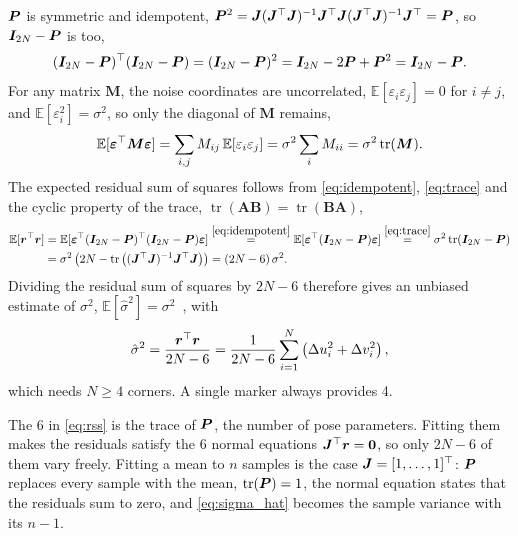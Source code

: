\documentclass{article}
\begin{document}
$\bm{P}$ is symmetric and idempotent, $\bm{P}^2 = \bm{J} (\bm{J}^\top \bm{J})^{-1} \bm{J}^\top \bm{J} (\bm{J}^\top \bm{J})^{-1} \bm{J}^\top = \bm{P}$, so $\bm{I}_{2N} - \bm{P}$ is too,
\begin{equation}
  (\bm{I}_{2N} - \bm{P})^\top (\bm{I}_{2N} - \bm{P}) = (\bm{I}_{2N} - \bm{P})^2 = \bm{I}_{2N} - 2\bm{P} + \bm{P}^2 = \bm{I}_{2N} - \bm{P} . \label{eq:idempotent}
\end{equation}
For any matrix $\bm{M}$, the noise coordinates are uncorrelated, $\mathbb{E}[\varepsilon_i \varepsilon_j] = 0$ for $i \neq j$, and $\mathbb{E}[\varepsilon_i^2] = \sigma^2$, so only the diagonal of $\bm{M}$ remains,
\begin{equation}
  \mathbb{E}[\bm{\varepsilon}^\top \bm{M} \bm{\varepsilon}]
  = \sum_{i,j} M_{ij} \, \mathbb{E}[\varepsilon_i \varepsilon_j]
  = \sigma^2 \sum_i M_{ii}
  = \sigma^2 \operatorname{tr}(\bm{M}) . \label{eq:trace}
\end{equation}
The expected residual sum of squares follows from \eqref{eq:idempotent}, \eqref{eq:trace} and the cyclic property of the trace, $\operatorname{tr}(\bm{A}\bm{B}) = \operatorname{tr}(\bm{B}\bm{A})$,
\begin{equation}
  \begin{aligned}
    \mathbb{E}[\bm{r}^\top \bm{r}]
     & = \mathbb{E}[\bm{\varepsilon}^\top (\bm{I}_{2N} - \bm{P})^\top (\bm{I}_{2N} - \bm{P}) \bm{\varepsilon}]
    \stackrel{\eqref{eq:idempotent}}{=} \mathbb{E}[\bm{\varepsilon}^\top (\bm{I}_{2N} - \bm{P}) \bm{\varepsilon}]
    \stackrel{\eqref{eq:trace}}{=} \sigma^2 \operatorname{tr}(\bm{I}_{2N} - \bm{P})                        \\
     & = \sigma^2 \left( 2N - \operatorname{tr}\left( (\bm{J}^\top \bm{J})^{-1} \bm{J}^\top \bm{J} \right) \right)
    = (2N - 6)\, \sigma^2 .
  \end{aligned}
  \label{eq:rss}
\end{equation}
Dividing the residual sum of squares by $2N - 6$ therefore gives an unbiased estimate of $\sigma^2$, $\mathbb{E}[\hat\sigma^2] = \sigma^2$~\cite{statproofbook_resvar_biasp}, with
\begin{equation}
  \hat\sigma^2 = \frac{\bm{r}^\top \bm{r}}{2N - 6} = \frac{1}{2N - 6} \sum_{i=1}^{N} \left( \Delta u_i^2 + \Delta v_i^2 \right), \label{eq:sigma_hat}
\end{equation}
which needs $N \geq 4$ corners. A single marker always provides 4.

The $6$ in \eqref{eq:rss} is the trace of $\bm{P}$, the number of pose parameters. Fitting them makes the residuals satisfy the 6 normal equations $\bm{J}^\top \bm{r} = \bm{0}$, so only $2N - 6$ of them vary freely. Fitting a mean to $n$ samples is the case $\bm{J} = [1, \dots, 1]^\top$: $\bm{P}$ replaces every sample with the mean, $\operatorname{tr}(\bm{P}) = 1$, the normal equation states that the residuals sum to zero, and \eqref{eq:sigma_hat} becomes the sample variance with its $n - 1$.
\end{document}
